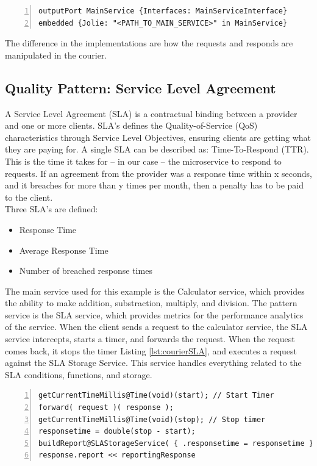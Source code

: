 \documentclass[12pt]{article}
\begin{document}
\begin{lstlisting}[caption=Embed main service into the pattern service, 
    captionpos=b, label={lst:embedService}, frame=single, breaklines=true, numbers=left, basicstyle=\scriptsize]
outputPort MainService {Interfaces: MainServiceInterface}
embedded {Jolie: "<PATH_TO_MAIN_SERVICE>" in MainService}
\end{lstlisting}

The difference in the implementations are how the requests and responds are manipulated in the courier.

\subsection{Quality Pattern: Service Level Agreement}
A Service Level Agreement (SLA) \cite{SLA} is a contractual binding between a provider and one or more clients. SLA's defines the Quality-of-Service (QoS) \cite{QoS} characteristics through Service Level Objectives, ensuring clients are getting what they are paying for. A single SLA can be described as: Time-To-Respond (TTR). This is the time it takes for -- in our case -- the microservice to respond to requests. If an agreement from the provider was a response time within x seconds, and it breaches for more than y times per month, then a penalty has to be paid to the client. \\

Three SLA's are defined:
\begin{itemize}
    \item Response Time
    \item Average Response Time
    \item Number of breached response times
\end{itemize}

The main service used for this example is the Calculator service, which provides the ability to make addition, substraction, multiply, and division. The pattern service is the SLA service, which provides metrics for the performance analytics of the service. When the client sends a request to the calculator service, the SLA service intercepts, starts a timer, and forwards the request. When the request comes back, it stops the timer Listing \ref{lst:courierSLA}, and executes a request against the SLA Storage Service. This service handles everything related to the SLA conditions, functions, and storage. 

\begin{lstlisting}[caption=Courier operation for the SLA service, 
captionpos=b, label={lst:courierSLA}, frame=single, breaklines=true, numbers=left, basicstyle=\scriptsize]
getCurrentTimeMillis@Time(void)(start); // Start Timer
forward( request )( response );
getCurrentTimeMillis@Time(void)(stop); // Stop timer
responsetime = double(stop - start);
buildReport@SLAStorageService( { .responsetime = responsetime } )( reportingResponse );
response.report << reportingResponse
\end{lstlisting}
\end{document}
